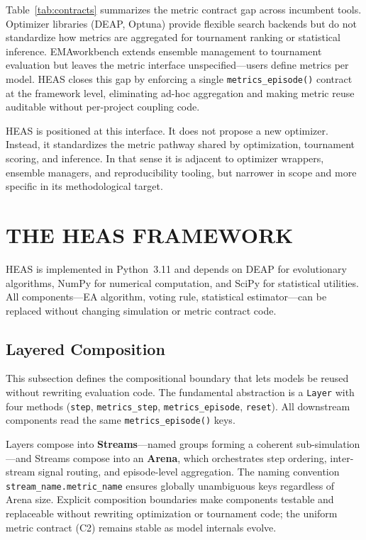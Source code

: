 \documentclass{wscpaperproc}
\begin{document}
Table~\ref{tab:contracts} summarizes the metric contract gap across incumbent tools.
Optimizer libraries (DEAP, Optuna) provide flexible search backends but do not
standardize how metrics are aggregated for tournament ranking or statistical inference.
EMAworkbench extends ensemble management to tournament evaluation but leaves the metric
interface unspecified---users define metrics per model. HEAS closes this gap by enforcing
a single \texttt{metrics\_episode()} contract at the framework level, eliminating
ad-hoc aggregation and making metric reuse auditable without per-project coupling code.

HEAS is positioned at this interface. It does not propose a new optimizer.
Instead, it standardizes the metric pathway shared by optimization, tournament
scoring, and inference. In that sense it is adjacent to optimizer wrappers,
ensemble managers, and reproducibility tooling, but narrower in scope and more
specific in its methodological target.

\section{THE HEAS FRAMEWORK}

HEAS is implemented in Python~3.11 and depends on DEAP for evolutionary
algorithms, NumPy for numerical computation, and SciPy for statistical
utilities. All components---EA algorithm, voting rule, statistical
estimator---can be replaced without changing simulation or metric contract code.

\subsection{Layered Composition}

This subsection defines the compositional boundary that lets models be reused
without rewriting evaluation code. The fundamental abstraction is a
\texttt{Layer} with four methods
(\texttt{step}, \texttt{metrics\_step}, \texttt{metrics\_episode},
\texttt{reset}). All downstream components read the same
\texttt{metrics\_episode()} keys.

Layers compose into \textbf{Streams}---named groups forming a coherent
sub-simulation---and Streams compose into an \textbf{Arena}, which orchestrates
step ordering, inter-stream signal routing, and episode-level aggregation. The
naming convention \texttt{stream\_name.metric\_name} ensures globally unambiguous
keys regardless of Arena size. Explicit composition boundaries make components
testable and replaceable without rewriting optimization or tournament code;
the uniform metric contract (C2) remains stable as model internals evolve.
\end{document}
